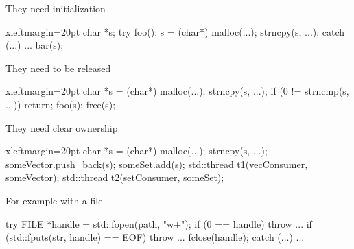 \begin{frame}[fragile]
  \begin{exampleblock}{They need initialization
      \hfill {}}
    \begin{cppcode*}{xleftmargin=20pt}
      char *s;
      try {
        foo();
        s = (char*) malloc(...);
        strncpy(s, ...);
      } catch (...) { ... }
      bar(s);
    \end{cppcode*}
  \end{exampleblock}
  \pause
  \pause
  \vspace{-2cm}
  \begin{exampleblock}{They need to be released
      \hfill {}}
    \begin{cppcode*}{xleftmargin=20pt}
      char *s = (char*) malloc(...);
      strncpy(s, ...);
      if (0 != strncmp(s, ...)) return;
      foo(s);
      free(s);
    \end{cppcode*}
  \end{exampleblock}
  \pause
  \pause
  \vspace{-2cm}
  \begin{exampleblock}{They need clear ownership
      \hfill {}}
    \begin{cppcode*}{xleftmargin=20pt}
      char *s = (char*) malloc(...);
      strncpy(s, ...);
      someVector.push_back(s);
      someSet.add(s);
      std::thread t1(vecConsumer, someVector);
      std::thread t2(setConsumer, someSet);
    \end{cppcode*}
  \end{exampleblock}
\end{frame}

\begin{frame}[fragile]
  \begin{exampleblock}{For example with a file}
    \begin{cppcode*}{}
      try {
        FILE *handle = std::fopen(path, "w+");
        if (0 == handle) { throw ... }
        if (std::fputs(str, handle) == EOF) {
          throw ...
        }
        fclose(handle);
      } catch (...) { ... }
    \end{cppcode*}
  \end{exampleblock}
\end{frame}

